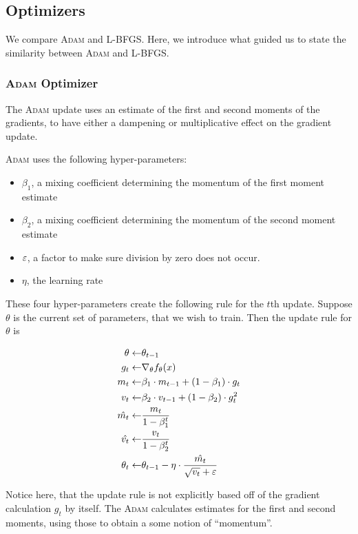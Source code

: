 \documentclass[11pt]{article}
\begin{document}
\subsection{Optimizers}
We compare \textsc{Adam} and \textsc{L-BFGS}.
Here, we introduce what guided us to state the similarity between \textsc{Adam} and \textsc{L-BFGS}.
\subsubsection{\textsc{Adam} Optimizer}
The \textsc{Adam} update uses an estimate of the first and second moments of the gradients, to have either a dampening or multiplicative effect on the gradient update.

\textsc{Adam} uses the following hyper-parameters:
\begin{itemize}
\item $\beta_1$, a mixing coefficient determining the momentum of the first moment estimate
\item $\beta_2$, a mixing coefficient determining the momentum of the second moment estimate
\item $\varepsilon$, a factor to make sure division by zero does not occur.
\item $\eta$, the learning rate
\end{itemize}

These four hyper-parameters create the following rule for the $t$th update.
Suppose $\theta$ is the current set of parameters, that we wish to train. Then the update rule for $\theta$ is

\begin{align*}
  \theta \leftarrow & \theta_{t-1} \\
  g_t \leftarrow & \nabla_\theta f_\theta(x) \\
  m_t \leftarrow & \beta_1 \cdot m_{t-1} + (1 - \beta_1) \cdot g_t \\
  v_t \leftarrow & \beta_2 \cdot v_{t-1} + (1 - \beta_2) \cdot g_t^2 \\
  \hat{m_t} \leftarrow & \frac{m_t}{1 - \beta_1^t} \\
  \hat{v_t} \leftarrow & \frac{v_t}{1 - \beta_2^t} \\
  \theta_t \leftarrow & \theta_{t-1} - \eta \cdot \frac{\hat{m_t}}{\sqrt{v_t} + \varepsilon}
\end{align*}

Notice here, that the update rule is not explicitly based off of the gradient calculation $g_t$ by itself.
The \textsc{Adam} calculates estimates for the first and second moments, using those to obtain a some notion of ``momentum''.
\end{document}

